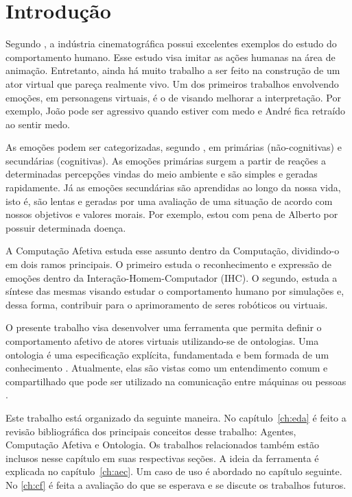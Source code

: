 \chapter{Introdução}

Segundo \citet{terzopoulos1998behavioral}, a indústria cinematográfica possui
excelentes exemplos do estudo do comportamento humano. Esse estudo visa imitar
as ações humanas na área de animação. Entretanto, ainda há muito trabalho a
ser feito na construção de um ator virtual que pareça realmente vivo. Um dos
primeiros trabalhos envolvendo emoções, em personagens virtuais, é o de
\citet{bates1994role} visando melhorar a interpretação. Por exemplo, João pode
ser agressivo quando estiver com medo e André fica retraído ao sentir medo.

As emoções podem ser categorizadas, segundo \citet{damasio2004erro}, em
primárias (não-cognitivas) e secundárias (cognitivas). As emoções primárias
surgem a partir de reações a determinadas percepções vindas do meio ambiente e
são simples e geradas rapidamente. Já as emoções secundárias são aprendidas ao
longo da nossa vida, isto é, são lentas e geradas por uma avaliação de uma
situação de acordo com nossos objetivos e valores morais. Por exemplo, estou
com pena de Alberto por possuir determinada doença.

A Computação Afetiva estuda esse assunto dentro da Computação, dividindo-o em
dois ramos principais. O primeiro estuda o reconhecimento e expressão de
emoções dentro da Interação-Homem-Computador (IHC). O segundo, estuda a
síntese das mesmas visando estudar o comportamento humano por simulações e,
dessa forma, contribuir para o aprimoramento de seres robóticos ou virtuais.

O presente trabalho visa desenvolver uma ferramenta que permita definir o
comportamento afetivo de atores virtuais utilizando-se de ontologias. Uma
ontologia é uma especificação explícita, fundamentada e bem formada de um
conhecimento \cite{gruber1993translation}. Atualmente, elas são vistas como um
entendimento comum e compartilhado que pode ser utilizado na comunicação entre
máquinas ou pessoas \cite{wks2008towards}.

Este trabalho está organizado da seguinte maneira. No capítulo~\ref{ch:eda}
é feito a revisão bibliográfica dos principais conceitos desse trabalho:
Agentes, Computação Afetiva e Ontologia. Os trabalhos relacionados também
estão inclusos nesse capítulo em suas respectivas seções. A ideia da
ferramenta é explicada no capítulo~\ref{ch:aec}. Um caso de uso é abordado no
capítulo seguinte. No \ref{ch:cf} é feita a avaliação do que se esperava e se
discute os trabalhos futuros.
